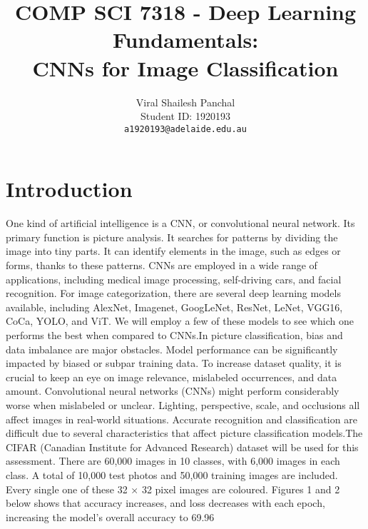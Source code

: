 \documentclass[10pt,twocolumn,letterpaper]{article}
\title{COMP SCI 7318 - Deep Learning Fundamentals: \\ CNNs for Image Classification}
\author{Viral Shailesh Panchal \\ Student ID: 1920193 \\ \texttt{a1920193@adelaide.edu.au}}
\date{}
\begin{document}
\maketitle



\section{Introduction}
One kind of artificial intelligence is a CNN, or convolutional neural network. Its primary function is picture analysis. It searches for patterns by dividing the image into tiny parts. It can identify elements in the image, such as edges or forms, thanks to these patterns. CNNs are employed in a wide range of applications, including medical image processing, self-driving cars, and facial recognition. For image categorization, there are several deep learning models available, including AlexNet, Imagenet, GoogLeNet, ResNet, LeNet, VGG16, CoCa, YOLO, and ViT. We will employ a few of these models to see which one performs the best when compared to CNNs.In picture classification, bias and data imbalance are major obstacles. Model performance can be significantly impacted by biased or subpar training data. To increase dataset quality, it is crucial to keep an eye on image relevance, mislabeled occurrences, and data amount. Convolutional neural networks (CNNs) might perform considerably worse when mislabeled or unclear. Lighting, perspective, scale, and occlusions all affect images in real-world situations. Accurate recognition and classification are difficult due to several characteristics that affect picture classification models.The CIFAR (Canadian Institute for Advanced Research) dataset will be used for this assessment. There are 60,000 images in 10 classes, with 6,000 images in each class. A total of 10,000 test photos and 50,000 training images are included. Every single one of these 32 × 32 pixel images are coloured.  Figures 1 and 2 below shows that accuracy increases, and loss decreases with each epoch, increasing the model's overall accuracy to 69.96%

\
\end{document}
